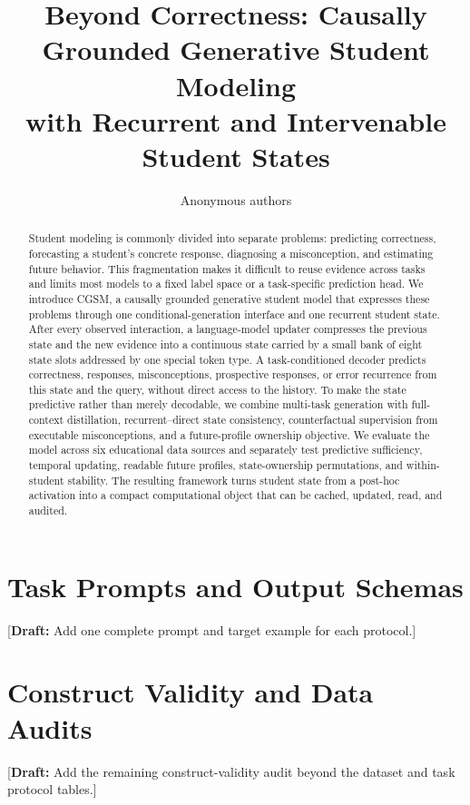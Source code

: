 \documentclass{article}
\title{Beyond Correctness: Causally Grounded Generative Student Modeling\\
with Recurrent and Intervenable Student States}
\author{Anonymous authors}
\newcommand{\model}{\textsc{CGSM}}
\newcommand{\draftnote}[1]{\textcolor{draftblue}{[\textbf{Draft:} #1]}}
\begin{document}
\maketitle

\begin{abstract}
Student modeling is commonly divided into separate problems: predicting
correctness, forecasting a student's concrete response, diagnosing a
misconception, and estimating future behavior.  This fragmentation makes it
difficult to reuse evidence across tasks and limits most models to a fixed
label space or a task-specific prediction head.  We introduce \model, a
causally grounded generative student model that expresses these problems
through one conditional-generation interface and one recurrent student state.
After every observed interaction, a language-model updater compresses the
previous state and the new evidence into a continuous state carried by a
small bank of eight state slots addressed by one special token type.  A
task-conditioned decoder predicts correctness,
responses, misconceptions, prospective responses, or error recurrence from
this state and the query, without direct access to the history.  To make the
state predictive rather than merely decodable, we combine multi-task
generation with full-context distillation, recurrent--direct state
consistency, counterfactual supervision from executable misconceptions, and a
future-profile ownership objective.  We evaluate the model across six
educational data sources and separately test predictive sufficiency, temporal
updating, readable future profiles, state-ownership permutations, and
within-student stability.  The resulting framework turns student state from a
post-hoc activation into a compact computational object that can be cached,
updated, read, and audited.
\end{abstract}










\appendix
\section{Task Prompts and Output Schemas}
\label{app:prompts}
\draftnote{Add one complete prompt and target example for each protocol.}

\section{Construct Validity and Data Audits}
\label{app:validity}

\draftnote{Add the remaining construct-validity audit beyond the dataset and
task protocol tables.}
\end{document}
